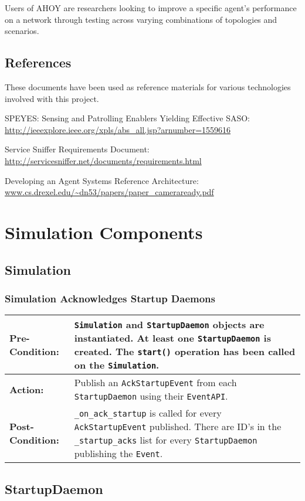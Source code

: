 \documentclass[titlepage]{article}
\renewenvironment{itemize*}
    {\begin{itemize}
        \setlength{\itemsep}{0pt}%
        \setlength{\parskip}{0pt}%
        \setlength{\partopsep}{0pt}%
        \setlength{\topsep}{0pt}}%
    {\end{itemize}}
\newcommand{\testcase}[3]{
    \begin{center}
    \begin{tabular}{| l | p{0.7\textwidth}|}
        \hline
        \rowcolor[gray]{0.8}\textbf{Pre-Condition:} & #1 \\ \hline
        \textbf{Action:} & #2 \\ \hline
        \rowcolor[gray]{0.8}\textbf{Post-Condition:} & #3 \\ \hline
    \end{tabular}
    \end{center}
}
\begin{document}
Users of AHOY are researchers looking to improve a specific agent's performance on a network through testing across varying combinations of topologies and scenarios.

\subsection{References%
  \label{references}%
}

These documents have been used as reference materials for various technologies involved with this project.
%
\begin{itemize*}
	\item SPEYES: Sensing and Patrolling Enablers Yielding Effective SASO: \url{http://ieeexplore.ieee.org/xpls/abs\_all.jsp?arnumber=1559616}
	\item Service Sniffer Requirements Document: \url{http://servicesniffer.net/documents/requirements.html}
    \item Developing an Agent Systems Reference Architecture: \url{www.cs.drexel.edu/~dn53/papers/paper\_cameraready.pdf}
\end{itemize*}

\section{Simulation Components}
\subsection{Simulation}

\subsubsection{Simulation Acknowledges Startup Daemons}

\testcase{\texttt{Simulation} and \texttt{StartupDaemon} objects are instantiated. At least one \texttt{StartupDaemon} is created. The \texttt{start()} operation has been called on the \texttt{Simulation}. }{Publish an \texttt{AckStartupEvent} from each \texttt{StartupDaemon} using their \texttt{EventAPI}.}{\texttt{\_on\_ack\_startup} is called for every \texttt{AckStartupEvent} published.  There are ID's in the \texttt{\_startup\_acks} list for every \texttt{StartupDaemon} publishing the \texttt{Event}.}

\subsection{StartupDaemon}
\end{document}
